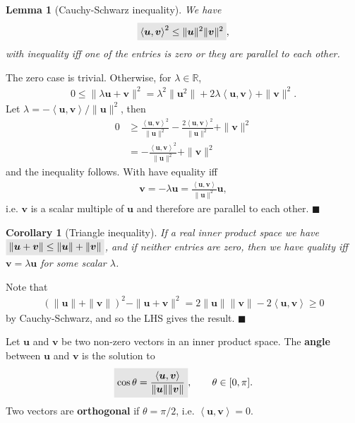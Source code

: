 \documentclass[letter-paper]{tufte-book}
\newtheorem{lemma}[theorem]{\color{pastel-blue}Lemma}
\newtheorem{corollary}[theorem]{\color{pastel-blue}Corollary}
\newenvironment{proof}[1][Proof]{\begin{trivlist}
\item[\hskip \labelsep {\bfseries #1}]}{\end{trivlist}}
\newcommand{\inner}[2]{\left\langle #1, #2\right\rangle}
\newcommand{\ub}{{\boldsymbol{u}}}
\newcommand{\vb}{{\boldsymbol{v}}}
\newcommand{\qed}{\hfill$\blacksquare$}
\newcommand{\highlight}[1]{\mathchoice%
  {\colorbox{black!10}{$\displaystyle#1$}}%
  {\colorbox{black!10}{$\textstyle#1$}}%
  {\colorbox{black!10}{$\scriptstyle#1$}}%
  {\colorbox{black!10}{$\scriptscriptstyle#1$}}}%
\begin{document}
\begin{lemma}[Cauchy-Schwarz inequality]
  We have
  \begin{equation}
    \highlight{\inner{\ub}{\vb}^2 \leq \|\ub\|^2 \|\vb\|^2},
  \end{equation}
  with inequality iff one of the entries is zero or they are parallel to each other.
\end{lemma}

\begin{proof}
  The zero case is trivial. Otherwise, for $\lambda\in\mathbb{R}$,
  \begin{align*}
    0 \leq \|\lambda \ub + \vb\|^2 = \lambda^2 \|\ub^2\| + 2\lambda\inner{\ub}{\vb} + \|\vb\|^2.
  \end{align*}
  Let $\lambda = -\inner{\ub}{\vb}/\|\ub\|^2$, then
  \begin{align*}
    0 
      &\geq \frac{\inner{\ub}{\vb}^2}{\|\ub\|^2} - \frac{2\inner{\ub}{\vb}^2}{\|\ub\|^2} + \|\vb\|^2 \\
      &= -\frac{\inner{\ub}{\vb}^2}{\|\ub\|^2} + \|\vb\|^2
  \end{align*}
  and the inequality follows. With have equality iff
  \begin{align*}
    \vb = -\lambda\ub = \frac{\inner{\ub}{\vb}}{\|\ub\|^2}\ub,
  \end{align*}
  i.e. $\vb$ is a scalar multiple of $\ub$ and therefore are parallel to each other. \qed
\end{proof}

\begin{corollary}[Triangle inequality]
  If a real inner product space we have $\highlight{\|\ub + \vb\| \leq \|\ub\| + \|\vb\|}$, and if neither entries are zero, then we have quality iff $\vb = \lambda\ub$ for some scalar $\lambda$.
\end{corollary}

\begin{proof}
  Note that
  \begin{align*}
    (\|\ub\| + \|\vb\|)^2 - \|\ub + \vb\|^2 = 2\|\ub\|\|\vb\| - 2\inner{\ub}{\vb} \geq 0
  \end{align*}
  by Cauchy-Schwarz, and so the LHS gives the result. \qed
\end{proof}

Let $\ub$ and $\vb$ be two non-zero vectors in an inner product space. The \textbf{angle} between $\ub$ and $\vb$ is the solution to
\begin{align}
  \highlight{\cos\theta = \frac{\inner{\ub}{\vb}}{\|\ub\|\|\vb\|}}, \qquad \theta\in[0, \pi].
\end{align}
Two vectors are \textbf{orthogonal} if $\theta=\pi/2$, i.e. $\inner{\ub}{\vb}=0$.
\end{document}

